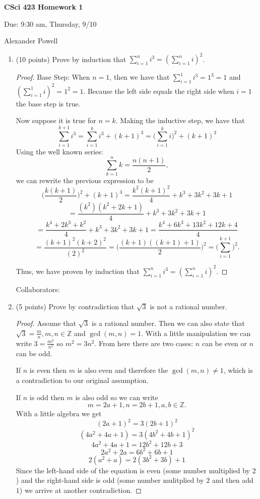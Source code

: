 \documentclass[11pt]{article}
\begin{document}
\begin{LARGE}
\centerline {\bf CSci 423 Homework 1}
\end{LARGE}
\vskip 0.25cm

\centerline{Due: 9:30 am, Thursday, 9/10}
\centerline{Alexander Powell}


\begin{enumerate}

\item (10 points) Prove by induction that $\sum_{i=1}^n i^3 = (\sum_{i=1}^n i)^2$.

\begin{proof}

Base Step: When $n = 1$, then we have that $\sum_{i=1}^1 i^3 = 1^3 = 1$ and $(\sum_{i=1}^1 i)^2 = 1^2 = 1$.  Because the left side equals the right side when $i=1$ the base step is true.  

Now suppose it is true for $n=k$.  Making the inductive step, we have that 
$$ \sum_{i=1}^{k+1} i^3 = \sum_{i=1}^k i^3 + (k+1)^3 = \bigg(\sum_{i=1}^k i\bigg)^2 + (k+1)^3 $$
Using the well known series: $$\sum_{k=1}^n k = \frac{n(n+1)}{2},$$ we can rewrite the previous expression to be 
$$ \bigg(\frac{k(k+1)}{2}\bigg)^2 + (k+1)^3 = \frac{k^2(k+1)^2}{4} + k^3 + 3k^2 + 3k + 1 $$
$$ = \frac{(k^2)(k^2+2k+1)}{4} + k^3 + 3k^2 + 3k + 1 $$
$$ = \frac{k^4+2k^3+k^2}{4} + k^3 + 3k^2 + 3k + 1 = \frac{k^4 + 6k^3 + 13k^2 + 12k + 4}{4} $$
$$ = \frac{(k+1)^2(k+2)^2}{(2)^2} = \bigg( \frac{(k+1)((k+1)+1)}{2} \bigg)^2 = \bigg( \sum_{i=1}^{k+1} \bigg)^2. $$

Thus, we have proven by induction that $\sum_{i=1}^n i^3 = (\sum_{i=1}^n i)^2$.

\end{proof}
Collaborators:

\item (5 points) Prove by contradiction that $\sqrt{3}$ is not a rational number.

\begin{proof}

Assume that $\sqrt{3}$ is a rational number.  Then we can also state that $\sqrt{3} = \frac{m}{n}, m,n \in \mathbb{Z}$ and $\gcd(m,n) = 1$.  With a little manipulation we can write $3 = \frac{m^2}{n^2}$ so $m^2 = 3n^2$.  From here there are two cases: $n$ can be even or $n$ can be odd.  

If $n$ is even then $m$ is also even and therefore the $\gcd(m,n) \neq 1$, which is a contradiction to our original assumption.  

If $n$ is odd then $m$ is also odd so we can write 
$$m = 2a+1, n = 2b+1, a,b \in \mathbb{Z}.$$
With a little algebra we get 
$$ (2a+1)^2 = 3(2b+1)^2 $$
$$ (4a^2+4a+1) = 3(4b^2+4b+1)^2 $$
$$ 4a^2 + 4a + 1 = 12b^2 + 12b + 3 $$
$$ 2a^2 + 2a = 6b^2 + 6b + 1 $$
$$ 2(a^2 + a) = 2(3b^2 + 3b) + 1 $$
Since the left-hand side of the equation is even (some number multiplied by $2$) and the right-hand side is odd (some number mulitplied by $2$ and then add $1$) we arrive at another contradiction.  


\end{proof}
\end{enumerate}
\end{document}
